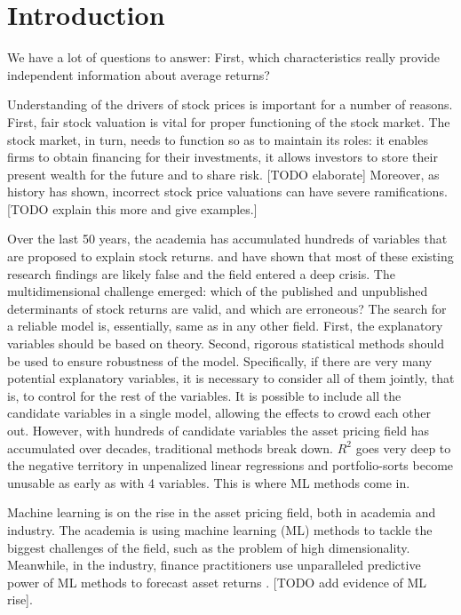 \chapter{Introduction}
\label{chap:int}

\setlength{\epigraphwidth}{0.8\textwidth}
\epigraph{We have a lot of questions to answer: First, which characteristics really provide independent information about average returns?}{\cite{cochrane2011presidential}}

Understanding of the drivers of stock prices is important for a number of reasons. First, fair stock valuation is vital for proper functioning of the stock market. The stock market, in turn, needs to function so as to maintain its roles: it enables firms to obtain financing for their investments, it allows investors to store their present wealth for the future and to share risk. [TODO elaborate] Moreover, as history has shown, incorrect stock price valuations can have severe ramifications. [TODO explain this more and give examples.]

Over the last 50 years, the academia has accumulated hundreds of variables that are proposed to explain stock returns. \cite{harvey2016and} and \cite{mclean2016does} have shown that most of these existing research findings are likely false and the field entered a deep crisis. The multidimensional challenge \citep{cochrane2011presidential} emerged: which of the published and unpublished determinants of stock returns are valid, and which are erroneous? The search for a reliable model is, essentially, same as in any other field. First, the explanatory variables should be based on theory. Second, rigorous statistical methods should be used to ensure robustness of the model. Specifically, if there are very many potential explanatory variables, it is necessary to consider all of them jointly, that is, to control for the rest of the variables. It is possible to include all the candidate variables in a single model, allowing the effects to crowd each other out. However, with hundreds of candidate variables the asset pricing field has accumulated over decades, traditional methods break down. $R^2$ goes very deep to the negative territory in unpenalized linear regressions \citep{gu2020empirical} and portfolio-sorts become unusable as early as with 4 variables. This is where ML methods come in. 

Machine learning is on the rise in the asset pricing field, both in academia and industry. The academia is using machine learning (ML) methods to tackle the biggest challenges of the field, such as the problem of high dimensionality. Meanwhile, in the industry, finance practitioners use unparalleled predictive power of ML methods to forecast asset returns \citep{gu2020empirical}. [TODO add evidence of ML rise].    

